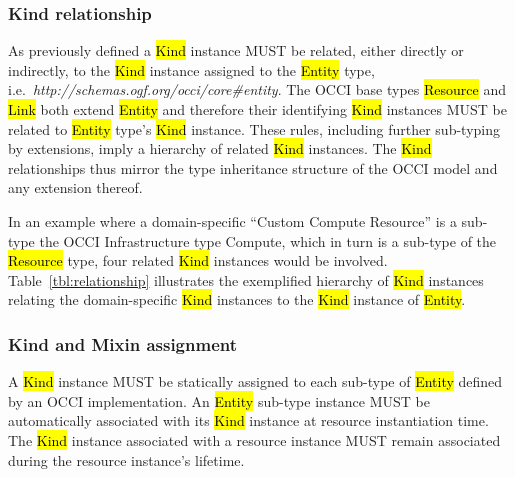 \documentclass[10pt,a4paper,british]{article}
\begin{document}
\subsubsection{Kind relationship}
\label{sec:type_relationship}
As previously defined a \hl{Kind} instance MUST be related, either directly or
indirectly, to the \hl{Kind} instance assigned to the \hl{Entity} type,
i.e.~\textit{http://schemas.ogf.org/occi/core\#entity}.
%
The OCCI base types \hl{Resource} and \hl{Link} both extend \hl{Entity} and
therefore their identifying \hl{Kind} instances MUST be related to \hl{Entity}
type's \hl{Kind} instance.
%
These rules, including further sub-typing by extensions, imply a hierarchy of
related \hl{Kind} instances. The \hl{Kind} relationships thus mirror the type
inheritance structure of the OCCI model and any extension thereof.

In an example where a domain-specific ``Custom Compute Resource'' is a sub-type
the OCCI Infrastructure type Compute, which in turn is a sub-type of the
\hl{Resource} type, four related \hl{Kind} instances would be involved.
%
Table~\ref{tbl:relationship} illustrates the exemplified hierarchy of \hl{Kind}
instances relating the domain-specific \hl{Kind} instances to the \hl{Kind}
instance of \hl{Entity}.


\subsubsection{Kind and Mixin assignment}
\label{sec:assignment}
A \hl{Kind} instance MUST be statically assigned to each sub-type of
\hl{Entity} defined by an OCCI implementation. An \hl{Entity} sub-type instance
MUST be automatically associated with its \hl{Kind} instance at resource
instantiation time. The \hl{Kind} instance associated with a resource instance
MUST remain associated during the resource instance's lifetime.
\end{document}

